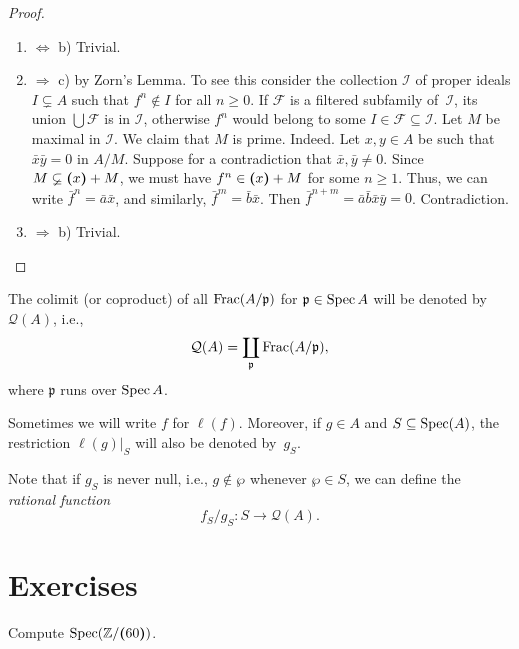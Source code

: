 \begin{proof} ${}$
    \begin{enumerate}[\rm a)]
        \item $\Leftrightarrow$ b) Trivial.
        
        \item $\Rightarrow$ c) by Zorn's Lemma. To see this consider the collection $\mathcal I$ of proper ideals $I\varsubsetneq A$ such that $f^n\notin I$ for all $n\ge0$. If $\mathcal F$ is a filtered subfamily of~$\mathcal I$, its union $\bigcup\mathcal F$ is in $\mathcal I$, otherwise $f^n$ would belong to some $I\in\mathcal F\subseteq\mathcal I$. Let $M$ be maximal in $\mathcal I$. We claim that $M$ is prime. Indeed. Let $x,y\in A$ be such that $\bar x\bar y=0$ in $A/M$. Suppose for a contradiction that $\bar x,\bar y\ne0$. Since $M\varsubsetneq\textrm{\boldmath$($}x\textrm{\boldmath$)$} + M$, we must have $f^n\in\textrm{\boldmath$($}x\textrm{\boldmath$)$}+M$ for some $n\ge1$. Thus, we can write $\bar f^n=\bar a\bar x$, and similarly, $\bar f^m=\bar b\bar x$. Then $\bar f^{n+m}=\bar a\bar b\bar x\bar y=0$. Contradiction.
    
        \item $\Rightarrow$ b) Trivial.
    \end{enumerate}
\end{proof}

\begin{ntn}\label{ntn:all-residue-fields}
    The colimit (or coproduct) of all $\operatorname{Frac}(A/\mathfrak p)$ for $\mathfrak p\in\operatorname{Spec} A$ will be denoted by $\mathcal Q(A)$, i.e.,
    $$
        \mathcal Q(A) = \coprod_{\mathfrak p}\operatorname{Frac}(A/\mathfrak p),
    $$
    where $\mathfrak p$ runs over $\operatorname{Spec} A$.

    Sometimes we will write\/ $f$ for\/ $\ell(f)$. Moreover, if\/ $g\in A$ and\/ $S\subseteq\operatorname{Spec}(A)$, the restriction\/ $\ell(g)|_S$ will also be denoted by~$g_S$.
    
    Note that if\/ $g_S$ is never null, i.e., $g\notin\wp$ whenever\/ $\wp\in S$, we can define the \textsl{rational function\/}
    $$
        f_S/g_S\colon S\to\mathcal Q(A).
    $$
\end{ntn}

\section{Exercises}

\begin{exr}
    Compute\/ $\operatorname{Spec}(\mathbb{Z}/\textrm{\boldmath$($}60\textrm{\boldmath$)$})$.
\end{exr}


